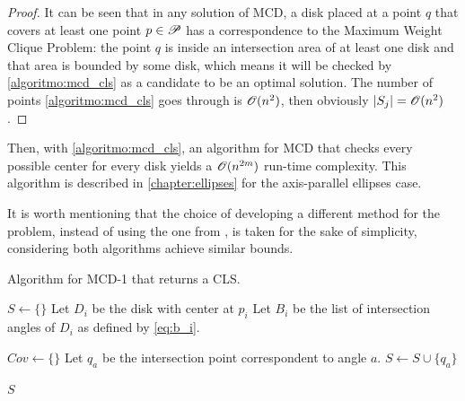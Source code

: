 \begin{proof}
It can be seen that in any solution of MCD, a disk placed at a point $q$ that covers at least one point $p \in \mathscr{P}$ has a correspondence to the Maximum Weight Clique Problem: the point $q$ is inside an intersection area of at least one disk and that area is bounded by some disk, which means it will be checked by \autoref{algoritmo:mcd_cls} as a candidate to be an optimal solution. The number of points \autoref{algoritmo:mcd_cls} goes through is $\mathscr{O}(n^2)$, then
obviously $|S_j|=\mathscr{O}(n^2)$.
\end{proof}

Then, with \autoref{algoritmo:mcd_cls}, an algorithm for MCD that checks every possible center for every disk yields a $\mathscr{O}(n^{2m})$ run-time complexity.
This algorithm is described in \autoref{chapter:ellipses} for the axis-parallel ellipses case.

It is worth mentioning that the choice of developing a different method for the problem, instead of using the one from , is taken for the sake of simplicity, considering both algorithms achieve similar bounds.

\begin{algoritmo}
	\caption{Algorithm for MCD-1 that returns a CLS.}\label{algoritmo:mcd_cls}
	\begin{algorithmic}[1]
		
		\item[]
		
		\State $S \gets \{\}$
		\State Let $D_i$ be the disk with center at $p_i$
		\State Let $B_i$ be the list of intersection angles of $D_i$ as defined by \autoref{eq:b_i}.
		
		\State $Cov \gets \{\}$
		\State Let $q_a$ be the intersection point correspondent to angle $a$. 
		\State $S \gets S \cup \{q_a\}$	
		\EndFor
		\EndFor
		
		\State \Return $S$
		\EndProcedure
	\end{algorithmic}
\end{algoritmo}